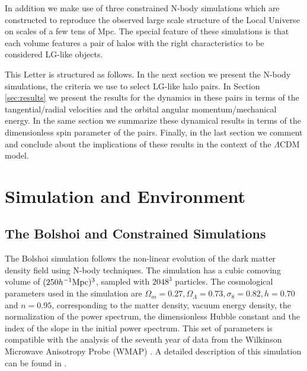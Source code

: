 \documentclass{emulateapj}
\newcommand{\hMpc}{{\ifmmode{h^{-1}{\rm Mpc}}\else{$h^{-1}$Mpc }\fi}}
\begin{document}
In addition we make use of three  constrained N-body simulations which
are constructed to reproduce the observed large scale structure of the
Local Universe on scales of a few tens of Mpc. The special feature of
these simulations is that each volume features a pair of halos with
the right characteristics to be considered LG-like objects. 

This Letter is structured as follows. In the next section we present
the N-body simulations, the criteria we use to select LG-like halo
pairs. In Section \ref{sec:results} we present the results for the
dynamics in these pairs in terms of the tangential/radial velocities
and the orbital angular momentum/mechanical energy. In the same
section we summarize these dynamical results in terms of the
dimensionless spin parameter of the pairs. Finally, in the last
section we comment and conclude about the implications of these
results in the context of the $\Lambda$CDM model. 



\section{Simulation and Environment}
\label{sec:methods}
\subsection{The Bolshoi and Constrained Simulations}



The Bolshoi simulation follows the non-linear evolution of the dark
matter density field using N-body techniques. The simulation has a
cubic comoving volume of $(250\hMpc )^3$, sampled with $2048^{3}$
particles. The cosmological parameters used in the simulation are
$\Omega_{m}=0.27, \Omega_{\Lambda}=0.73, \sigma_{8}=0.82, h=0.70$ and
$n=0.95$, corresponding to the matter density, vacuum energy density,
the normalization of the power spectrum, the dimensionless Hubble
constant and the index of the slope in the initial power
spectrum. This set of parameters is compatible with the analysis  of
the seventh year of data from the Wilkinson Microwave Anisotropy Probe
(WMAP) \citep{Jarosik2011}. A detailed description of this simulation
can be found in \cite{Bolshoi}. 
\end{document}
